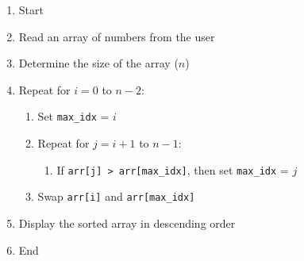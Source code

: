 \begin{enumerate}
    \item Start
    \item Read an array of numbers from the user
    \item Determine the size of the array ($n$)
    \item Repeat for $i = 0$ to $n - 2$:
    \begin{enumerate}
        \item Set \texttt{max\_idx} = $i$
        \item Repeat for $j = i + 1$ to $n - 1$:
        \begin{enumerate}
            \item If \texttt{arr[j] > arr[max\_idx]}, then set \texttt{max\_idx} = $j$
        \end{enumerate}
        \item Swap \texttt{arr[i]} and \texttt{arr[max\_idx]}
    \end{enumerate}
    \item Display the sorted array in descending order
    \item End
\end{enumerate}


